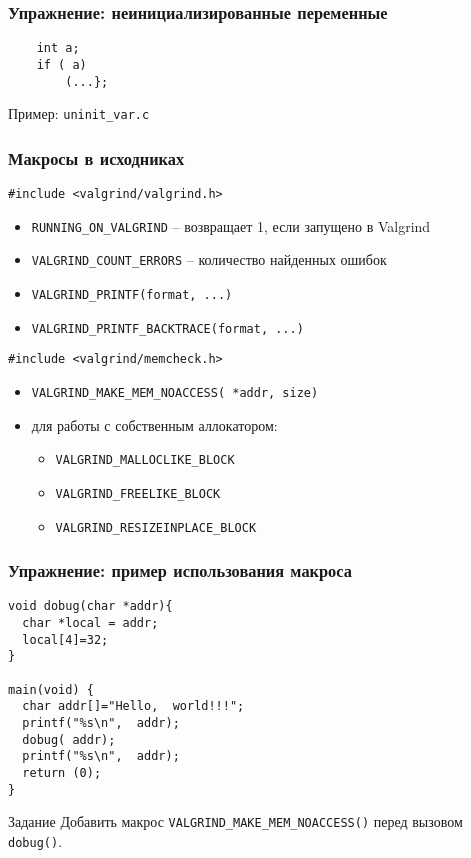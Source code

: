 \begin{frame}[fragile]
	\frametitle{Упражнение: неинициализированные переменные}

	\begin{lstlisting}
    int a;
    if ( a)
        (...};
	\end{lstlisting}

	Пример: {\tt uninit\_var.c}
\end{frame}

\begin{frame}[fragile]
	\frametitle{Макросы в исходниках}
	
	\begin{lstlisting}
#include <valgrind/valgrind.h>
	\end{lstlisting}

	\begin{itemize}
		\item {\tt RUNNING\_ON\_VALGRIND} -- возвращает 1, если запущено в Valgrind
		\item {\tt VALGRIND\_COUNT\_ERRORS} -- количество найденных ошибок
		\item {\tt VALGRIND\_PRINTF(format, ...)}
		\item {\tt VALGRIND\_PRINTF\_BACKTRACE(format, ...)}
	\end{itemize}

	\begin{lstlisting}
#include <valgrind/memcheck.h>
	\end{lstlisting}

	\begin{itemize}
		\item {\tt VALGRIND\_MAKE\_MEM\_NOACCESS( *addr, size)}
		\item для работы с собственным аллокатором:\\
		\begin{itemize}
			\item {\tt VALGRIND\_MALLOCLIKE\_BLOCK}
			\item {\tt VALGRIND\_FREELIKE\_BLOCK}
			\item {\tt VALGRIND\_RESIZEINPLACE\_BLOCK}
		\end{itemize}
	\end{itemize}


\end{frame}

\begin{frame}[fragile]
	\frametitle{Упражнение: пример использования макроса}

	\begin{lstlisting}
void dobug(char *addr){
  char *local = addr;
  local[4]=32;
}

main(void) {
  char addr[]="Hello,  world!!!";
  printf("%s\n",  addr);
  dobug( addr);
  printf("%s\n",  addr);
  return (0);
}
	\end{lstlisting}


	\begin{block}{Задание}
		Добавить макрос {\tt VALGRIND\_MAKE\_MEM\_NOACCESS()} перед вызовом {\tt dobug()}.
	\end{block}

\end{frame}


